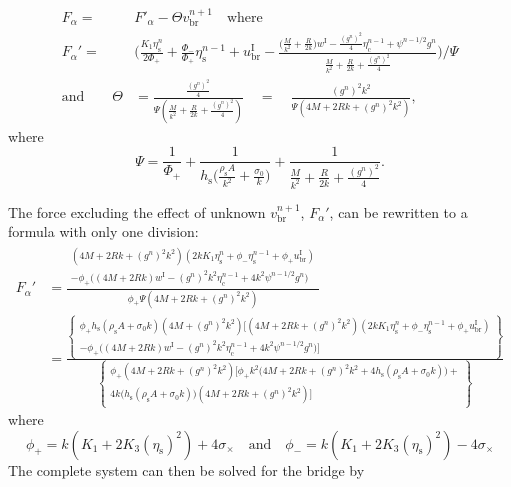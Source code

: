 \documentclass{article}
\begin{document}
\begin{align}
    F_\alpha = &F'_\alpha - \Theta v^{n+1}_\text{br} \quad \text{where}\\
    F_\alpha' =& \Bigg(\frac{K_1\eta^n_\text{s}}{2\Phi_+}+\frac{\Phi_-}{\Phi_+}\eta_\text{s}^{n-1}+u^\text{I}_\text{br}-\frac{\Big(\frac{M}{k^2}+\frac{R}{2k}\Big)w^\text{I}-\frac{(g^n)^2}{4}\eta_\text{c}^{n-1}+\psi^{n-1/2}g^n}{\frac{M}{k^2}+\frac{R}{2k}+\frac{(g^n)^2}{4}}\Bigg)/\Psi\\
    \text{and} \quad \quad \Theta &= \frac{\frac{(g^n)^2}{4}}{\Psi(\frac{M}{k^2} + \frac{R}{2k} + \frac{(g^n)^2}{4})}\quad =\quad \frac{(g^n)^2 k^2}{\Psi (4M+2Rk+(g^n)^2k^2)},
\end{align}
where 
\begin{equation}
    \Psi = \frac{1}{\Phi_+} +  \frac{1}{h_\text{s}\Big(\frac{\rho_\text{s}A}{k^2} + \frac{\sigma_0}{k}\Big)}+\frac{1}{\frac{M}{k^2}+\frac{R}{2k} + \frac{(g^n)^2}{4}}.
\end{equation}

The force excluding the effect of unknown $v_\text{br}^{n+1}$, $F_\alpha'$, can be rewritten to a formula with only one division:
\begin{align}\label{eq:fAlphaOneDivision}
    F_\alpha' &= \frac{\begin{gathered}(4M+ 2Rk + (g^n)^2k^2)(2kK_1\eta_\text{s}^n+\phi_-\eta_\text{s}^{n-1} +\phi_+u^\text{I}_\text{br}) \\
    - \phi_+\Big((4M+2Rk)w^\text{I} - (g^n)^2k^2\eta_\text{c}^{n-1} + 4k^2\psi^{n-1/2}g^n\Big)\end{gathered}}{\phi_+\Psi(4M+2Rk + (g^n)^2k^2)}\\
    &=\frac{\left\{
    \begin{gathered}
    \phi_+h_\text{s}(\rho_\text{s}A+\sigma_0k)(4M+(g^n)^2k^2)\Big[(4M+2Rk+(g^n)^2k^2)(2kK_1\eta_\text{s}^n+\phi_-\eta_\text{s}^{n-1}+\phi_+u_\text{br}^\text{I})\\
    -\phi_+\Big((4M+2Rk)w^\text{I}-(g^n)^2k^2\eta_\text{c}^{n-1}+4k^2\psi^{n-1/2}g^n\Big)\Big]
    \end{gathered}
    \right\}}{
    \left\{\begin{gathered}\phi_+(4M+2Rk+(g^n)^2k^2)\bigg[\phi_+k^2\Big(4M + 2Rk +(g^n)^2k^2 + 4h_\text{s}(\rho_\text{s}A+\sigma_0k)\Big)+\\
    4k\Big(h_\text{s}(\rho_\text{s}A+\sigma_0k)\Big)(4M+2Rk +(g^n)^2k^2)\bigg]
    \end{gathered}\right\}}
\end{align}
where 
\begin{equation}
    \phi_+ = k (K_1 + 2 K_3 (\eta_\text{s})^2) + 4 \sigma_\times \quad \text{and} \quad \phi_- = k (K_1 + 2 K_3 (\eta_\text{s})^2) - 4 \sigma_\times
\end{equation}
The complete system can then be solved for the bridge by
\end{document}
